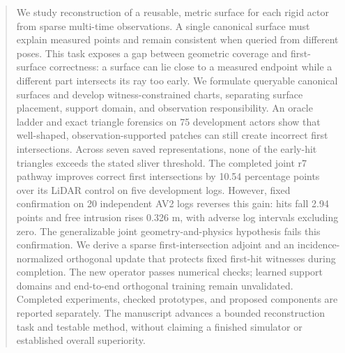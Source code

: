 \begin{abstract}
We study reconstruction of a reusable, metric surface for each rigid actor from sparse multi-time observations. A single canonical surface must explain measured points and remain consistent when queried from different poses. This task exposes a gap between geometric coverage and first-surface correctness: a surface can lie close to a measured endpoint while a different part intersects its ray too early. We formulate queryable canonical surfaces and develop witness-constrained charts, separating surface placement, support domain, and observation responsibility. An oracle ladder and exact triangle forensics on 75 development actors show that well-shaped, observation-supported patches can still create incorrect first intersections. Across seven saved representations, none of the early-hit triangles exceeds the stated sliver threshold. The completed joint r7 pathway improves correct first intersections by 10.54 percentage points over its LiDAR control on five development logs. However, fixed confirmation on 20 independent AV2 logs reverses this gain: hits fall 2.94 points and free intrusion rises 0.326 m, with adverse log intervals excluding zero. The generalizable joint geometry-and-physics hypothesis fails this confirmation. We derive a sparse first-intersection adjoint and an incidence-normalized orthogonal update that protects fixed first-hit witnesses during completion. The new operator passes numerical checks; learned support domains and end-to-end orthogonal training remain unvalidated. Completed experiments, checked prototypes, and proposed components are reported separately. The manuscript advances a bounded reconstruction task and testable method, without claiming a finished simulator or established overall superiority.
\end{abstract}
